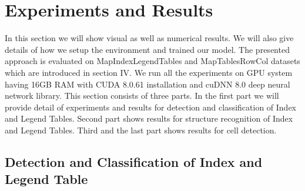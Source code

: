 \section{Experiments and Results}
\label{expResults}
In this section we will show visual as well as numerical results. We will also give details of how we setup the environment and trained our model. The presented approach is evaluated on MapIndexLegendTables and MapTablesRowCol datasets which are introduced in section IV. We run all the experiments on GPU system having 16GB RAM with CUDA 8.0.61 installation and cuDNN 8.0 deep neural network library.
This section consists of three parts. In the first part we will provide detail of experiments and results for detection and classification of Index and Legend Tables. Second part shows results for structure recognition of Index and Legend Tables. Third and the last part shows results for cell detection.
\subsection{Detection and Classification of Index and Legend Table}
\label{sec:expResults_table}
\begin{table}[h!]
\caption{Results for Table Detection}
\label{tbl:table_detection}
\centering
{}
\end{table}

